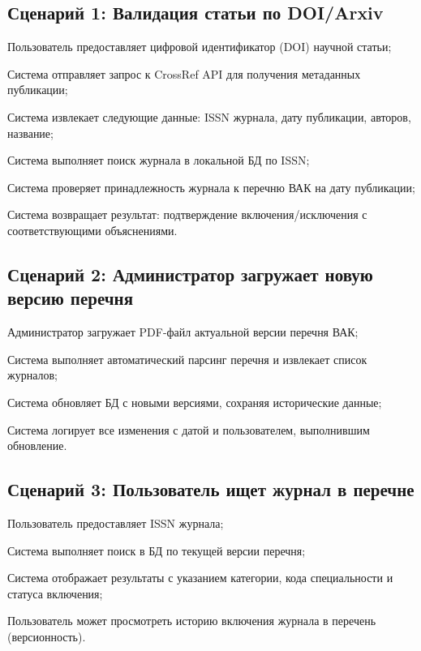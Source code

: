 \subsection*{Сценарий 1: Валидация статьи по DOI/Arxiv} 
	\begin{compactenum}
			\item Пользователь предоставляет цифровой идентификатор (DOI) научной статьи;
			\item Система отправляет запрос к CrossRef API для получения метаданных публикации;
			\item Система извлекает следующие данные: ISSN журнала, дату публикации, авторов, название;
			\item Система выполняет поиск журнала в локальной БД по ISSN;
			\item Система проверяет принадлежность журнала к перечню ВАК на дату публикации;
			\item Система возвращает результат: подтверждение включения/исключения с соответствующими объяснениями.
	\end{compactenum}


\subsection*{Сценарий 2: Администратор загружает новую версию перечня}
	\begin{compactenum} 
			\item Администратор загружает PDF-файл актуальной версии перечня ВАК;
			\item Система выполняет автоматический парсинг перечня и извлекает список журналов;
			\item Система обновляет БД с новыми версиями, сохраняя исторические данные;
			\item Система логирует все изменения с датой и пользователем, выполнившим обновление.
	\end{compactenum}


\subsection*{Сценарий 3: Пользователь ищет журнал в перечне}
	\begin{compactenum}
			\item Пользователь предоставляет ISSN журнала;
			\item Система выполняет поиск в БД по текущей версии перечня;
			\item Система отображает результаты с указанием категории, кода специальности и статуса включения;
			\item Пользователь может просмотреть историю включения журнала в перечень (версионность).
	\end{compactenum}


